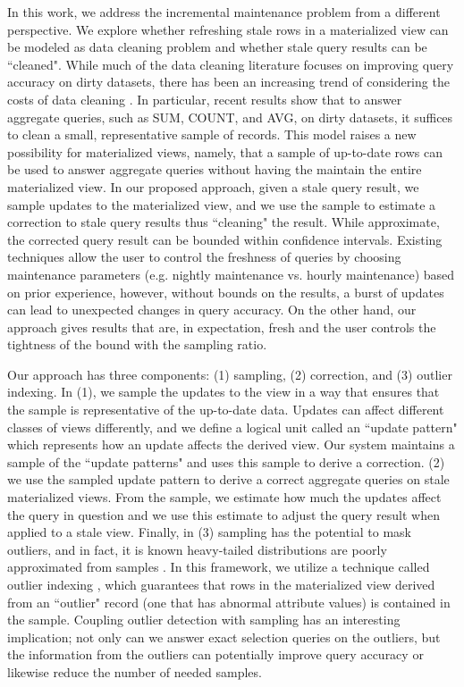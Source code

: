 In this work, we address the incremental maintenance problem from a different perspective.
We explore whether refreshing stale rows in a materialized view can be modeled as data cleaning problem and whether stale query results can be ``cleaned".
While much of the data cleaning literature focuses on improving query accuracy on dirty datasets,
there has been an increasing trend of considering the costs of data cleaning \cite{wang1999sample}.
In particular, recent results show that to answer aggregate queries, such as SUM, COUNT, and AVG, on dirty datasets, it suffices to clean a small, representative sample of records.
This model raises a new possibility for materialized views, namely, that a sample of up-to-date rows can be used to answer aggregate queries without having the maintain the entire materialized view.
In our proposed approach, given a stale query result, we sample updates to the materialized view, and we use the sample to estimate a correction to stale query results thus ``cleaning" the result.
While approximate, the corrected query result can be bounded within confidence intervals.
Existing techniques allow the user to control the freshness of queries by choosing maintenance parameters (e.g. nightly maintenance vs. hourly maintenance) based on prior experience, however, without bounds on the results, a burst of updates can lead to unexpected changes in query accuracy.
On the other hand, our approach gives results that are, in expectation, fresh and the user controls the tightness of the bound with the sampling ratio.

Our approach has three components: (1) sampling, (2) correction, and (3) outlier indexing. In (1), we sample the updates to the view in a way that ensures that the sample is representative of the up-to-date data. Updates can affect different classes of views differently, and we define a logical unit called an ``update pattern" which represents how an update affects the derived view. Our system maintains a sample of the ``update patterns" and uses this sample to derive a correction. (2) we use the sampled update pattern to derive a correct aggregate queries on stale materialized views.
From the sample, we estimate how much the updates affect the query in question and we use this estimate to adjust the query result when applied to a stale view.
Finally, in (3) sampling has the potential to mask outliers, and in fact, it is known
heavy-tailed distributions are poorly approximated from samples \cite{chaudhuri2001overcoming}.
In this framework, we utilize a technique called outlier indexing \cite{chaudhuri2001overcoming}, which guarantees that rows in the materialized view derived from an ``outlier" record (one that has abnormal attribute values) is contained in the sample.
Coupling outlier detection with sampling has an interesting implication; not only can we answer exact selection queries on the outliers, but
the information from the outliers can potentially improve query accuracy or likewise reduce the number of needed samples.

